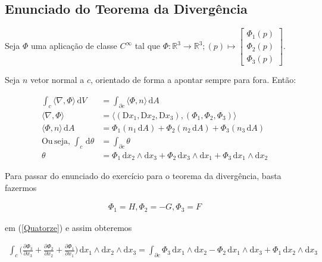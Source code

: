\documentclass[12pt,a4paper]{article}
\begin{document}
	\subsection{Enunciado do Teorema da Diverg\^encia}				
		\begin{flushright}
		\end{flushright}
		
		Seja $\Phi$ uma aplica\c{c}\~ao de classe $C^\infty$ tal que $\Phi : \mathbb{R}^3 \rightarrow \mathbb{R}^3 ; (p) \mapsto \begin{bmatrix} \Phi_1(p) \\ \Phi_2(p) \\ \Phi_3(p) \end{bmatrix}$.
		
		Seja $n$ vetor normal a $c$, orientado de forma a apontar sempre para fora. Ent\~ao:
		
		\begin{align}
			\int_c \langle \nabla , \Phi \rangle \,\mathrm{d}V &= \int_{\partial c} \langle \Phi , n \rangle \,\mathrm{d}A \\
			\langle \nabla , \Phi \rangle &= \langle (\mathrm{D}x_1, \mathrm{D}x_2, \mathrm{D}x_3), (\Phi_1, \Phi_2, \Phi_3) \rangle \\
			\langle \Phi , n \rangle \,\mathrm{d}A &= \Phi_1 (n_1 \,\mathrm{d}A) + \Phi_2 (n_2 \,\mathrm{d}A) + \Phi_3 (n_3 \,\mathrm{d}A) \\
			\mathrm{Ou\,seja,\,} \int_c \,\mathrm{d}\theta &= \int_{\partial c} \theta \\
			\theta &= \Phi_1 \,\mathrm{d}x_2 \wedge\mathrm{d}x_3 + \Phi_2 \,\mathrm{d}x_3 \wedge\mathrm{d}x_1 + \Phi_3 \,\mathrm{d}x_1 \wedge\mathrm{d}x_2
		\end{align}
		
		Para passar do enunciado do exerc\'icio para o teorema da diverg\^encia, basta fazermos 
		
		\begin{align}
			\Phi_1 = H, \Phi_2 = -G, \Phi_3 = F
		\end{align}
		
		em (\ref{Quatorze}) e assim obteremos
		
		\begin{align}
			\int_c \biggl( \frac{\partial \Phi_3}{\partial x_3} + \frac{\partial \Phi_2}{\partial x_2} + \frac{\partial \Phi_1}{\partial x_1} \biggl) \,\mathrm{d}x_1 \wedge\mathrm{d}x_2 \wedge\mathrm{d}x_3 = \int_{\partial c} \Phi_3 \,\mathrm{d}x_1 \wedge \mathrm{d}x_2 - \Phi_2 \,\mathrm{d}x_1 \wedge \mathrm{d}x_3 + \Phi_1 \,\mathrm{d}x_2 \wedge \mathrm{d}x_3
		\end{align}
		
\end{document}
